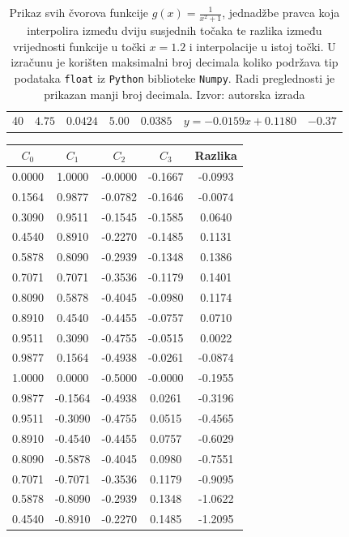 \documentclass[12pt,a4paper]{report}
\begin{document}
\begin{table}
\begin{center}
\begin{tabular}{c | cc|cc|c|c}
			40 &$4.75$&$0.0424$&$5.00$&$0.0385$&$y = -0.0159x+0.1180$&$-0.37$\\
		\end{tabular}
	\end{center}
	\caption{
		Prikaz svih čvorova funkcije $g(x)=\frac{1}{x^2 +1}$, jednadžbe pravca koja interpolira između dviju susjednih točaka te razlika između vrijednosti funkcije u točki $x=1.2$ i interpolacije u istoj točki. U izračunu je korišten maksimalni broj decimala koliko podržava tip podataka \texttt{float} iz \texttt{Python} biblioteke \texttt{Numpy}. Radi preglednosti je prikazan manji broj decimala. Izvor: autorska izrada}
	\label{linInterpolTablicaDva}
\end{table}
	\begin{table}
	\begin{center}		
		\begin{tabular}{c c c c | c}
			$C_0$&$C_1$&$C_2$&$C_3$&Razlika\\\hline
0.0000 & 1.0000 & -0.0000 & -0.1667 & -0.0993 \\
0.1564 & 0.9877 & -0.0782 & -0.1646 & -0.0074 \\
0.3090 & 0.9511 & -0.1545 & -0.1585 & 0.0640 \\
0.4540 & 0.8910 & -0.2270 & -0.1485 & 0.1131 \\
0.5878 & 0.8090 & -0.2939 & -0.1348 & 0.1386 \\
0.7071 & 0.7071 & -0.3536 & -0.1179 & 0.1401 \\
0.8090 & 0.5878 & -0.4045 & -0.0980 & 0.1174 \\
0.8910 & 0.4540 & -0.4455 & -0.0757 & 0.0710 \\
0.9511 & 0.3090 & -0.4755 & -0.0515 & 0.0022 \\
0.9877 & 0.1564 & -0.4938 & -0.0261 & -0.0874 \\
1.0000 & 0.0000 & -0.5000 & -0.0000 & -0.1955 \\
0.9877 & -0.1564 & -0.4938 & 0.0261 & -0.3196 \\
0.9511 & -0.3090 & -0.4755 & 0.0515 & -0.4565 \\
0.8910 & -0.4540 & -0.4455 & 0.0757 & -0.6029 \\
0.8090 & -0.5878 & -0.4045 & 0.0980 & -0.7551 \\
0.7071 & -0.7071 & -0.3536 & 0.1179 & -0.9095 \\
0.5878 & -0.8090 & -0.2939 & 0.1348 & -1.0622 \\
0.4540 & -0.8910 & -0.2270 & 0.1485 & -1.2095 \\

\end{tabular}
\end{center}
\end{table}
\end{document}

